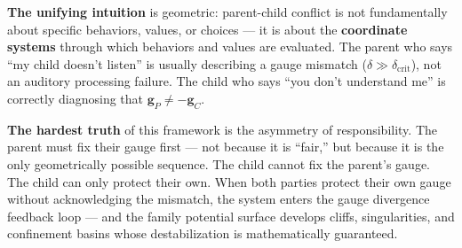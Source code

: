 \documentclass[11pt,a4paper]{article}
\begin{document}
\textbf{The unifying intuition} is geometric: parent-child conflict is not fundamentally about specific behaviors, values, or choices — it is about the \textbf{coordinate systems} through which behaviors and values are evaluated. The parent who says ``my child doesn't listen'' is usually describing a gauge mismatch ($\delta \gg \delta_{\text{crit}}$), not an auditory processing failure. The child who says ``you don't understand me'' is correctly diagnosing that $\mathbf{g}_P \neq -\mathbf{g}_C$.

\textbf{The hardest truth} of this framework is the asymmetry of responsibility. The parent must fix their gauge first — not because it is ``fair,'' but because it is the only geometrically possible sequence. The child cannot fix the parent's gauge. The child can only protect their own. When both parties protect their own gauge without acknowledging the mismatch, the system enters the gauge divergence feedback loop — and the family potential surface develops cliffs, singularities, and confinement basins whose destabilization is mathematically guaranteed.

\begin{center}
\end{center}
\end{document}
